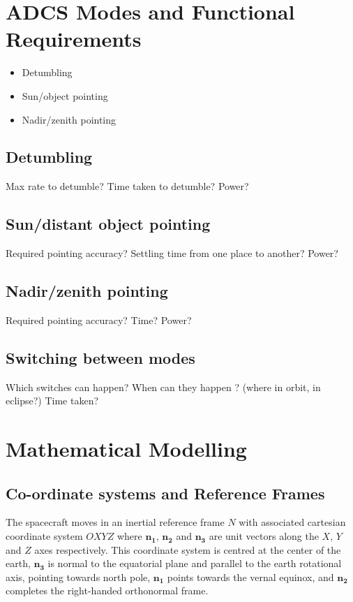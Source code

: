 \section{ADCS Modes and Functional Requirements}

\begin{itemize}
\item Detumbling
\item Sun/object pointing
\item Nadir/zenith pointing
\end{itemize}

\subsection{Detumbling} %
Max rate to detumble?
Time taken to detumble?
Power?

\subsection{Sun/distant object pointing} %
Required pointing accuracy?
Settling time from one place to another?
Power?

\subsection{Nadir/zenith pointing} %
Required pointing accuracy?
Time?
Power?

\subsection{Switching between modes} %
Which switches can happen?
When can they happen ? (where in orbit, in eclipse?)
Time taken?

\section{Mathematical Modelling}
\subsection{Co-ordinate systems and Reference Frames}

The spacecraft moves in an inertial reference frame $N$ with associated cartesian coordinate system $OXYZ$ where $\mathbf{n_1}$, $\mathbf{n_2}$ and $\mathbf{n_3}$ are unit vectors along the $X$, $Y$ and $Z$ axes respectively. This coordinate system is centred at the center of the earth, $\mathbf{n_3}$ is normal to the equatorial plane and parallel to the earth rotational axis, pointing towards north pole, $\mathbf{n_1}$ points towards the vernal equinox, and $\mathbf{n_2}$ completes the right-handed orthonormal frame.

